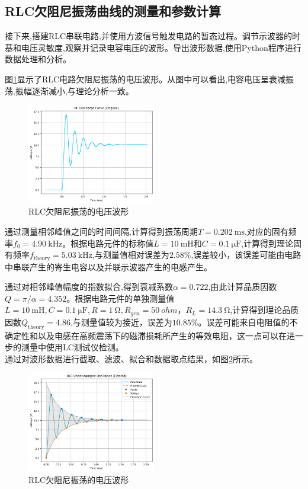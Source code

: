 \documentclass[UTF8]{ctexart}
\begin{document}
\subsection{RLC欠阻尼振荡曲线的测量和参数计算}

接下来,搭建RLC串联电路,并使用方波信号触发电路的暂态过程。调节示波器的时基和电压灵敏度,观察并记录电容电压的波形。导出波形数据,使用Python程序进行数据处理和分析。

图\ref{fig:rlc_oscillation}显示了RLC电路欠阻尼振荡的电压波形。从图中可以看出,电容电压呈衰减振荡,振幅逐渐减小,与理论分析一致。

\begin{figure}[htbp]
    \centering
    \includegraphics[width=0.5\textwidth]{rlc_oscillation.png}
    \caption{RLC欠阻尼振荡的电压波形}
    \label{fig:rlc_oscillation}
\end{figure}

通过测量相邻峰值之间的时间间隔,计算得到振荡周期$T = \SI{0.202}{\milli\second}$,对应的固有频率$f_0 = \SI{4.90}{\kilo\hertz}$。根据电路元件的标称值$L = \SI{10}{\milli\henry}$和$C = \SI{0.1}{\micro\farad}$,计算得到理论固有频率$f_{\text{theory}} = \SI{5.03}{\kilo\hertz}$,与测量值相对误差为$2.58\%$,误差较小，该误差可能由电路中串联产生的寄生电容以及并联示波器产生的电感产生。

通过对相邻峰值幅度的指数拟合,得到衰减系数$\alpha = 0.722$,由此计算品质因数$Q = \pi/\alpha = 4.352$。根据电路元件的单独测量值$L=\SI{10}{\milli\henry},C=\SI{0.1}{\micro\farad},R=\SI{1}{\ohm},R_{gen}=\SI{50}{ohm}，R_{L}=\SI{14.3}{\ohm}$,计算得到理论品质因数$Q_{\text{theory}} = 4.86$,与测量值较为接近，误差为$10.85\%$。误差可能来自电阻值的不确定性和以及电感在高频震荡下的磁滞损耗所产生的等效电阻，这一点可以在进一步的测量中使用LC测试仪检测。
\\ 通过对波形数据进行截取、滤波、拟合和数据取点结果，如图\ref{fig:rlc_oscillation_processed}所示。
\begin{figure}[htbp]
    \centering
    \includegraphics[width=0.5\textwidth]{rlc_oscillation_processed.png}
    \caption{RLC欠阻尼振荡的电压波形}
    \label{fig:rlc_oscillation_processed}
\end{figure}
\newpage
\end{document}
